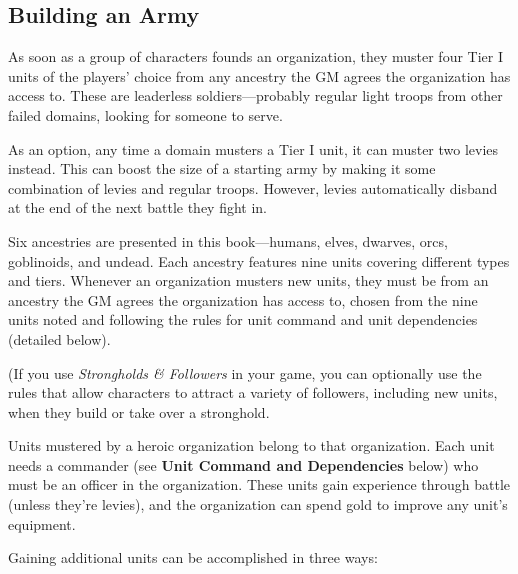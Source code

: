 \documentclass[10pt,a4paper,twoside,bg=print,twocolumn,openany,nodeprecatedcode]{dndbook}
\begin{document}
\subsection{Building an Army}
As soon as a group of characters founds an organization, they muster four Tier I units of the players' choice from any ancestry the GM agrees the organization has access to. These are leaderless soldiers—probably regular light troops from other failed domains, looking for someone to serve.

As an option, any time a domain musters a Tier I unit, it can muster two levies instead. This can boost the size of a starting army by making it some combination of levies and regular troops. However, levies automatically disband at the end of the next battle they fight in.

Six ancestries are presented in this book—humans, elves, dwarves, orcs, goblinoids, and undead. Each ancestry features nine units covering different types and tiers. Whenever an organization musters new units, they must be from an ancestry the GM agrees the organization has access to, chosen from the nine units noted and following the rules for unit command and unit dependencies (detailed below).

(If you use \textit{Strongholds \& Followers} in your game, you can optionally use the rules that allow characters to attract a variety of followers, including new units, when they build or take over a stronghold.

Units mustered by a heroic organization belong to that organization. Each unit needs a commander (see \textbf{Unit Command and Dependencies} below) who must be an officer in the organization. These units gain experience through battle (unless they're levies), and the organization can spend gold to improve any unit's equipment.

Gaining additional units can be accomplished in three ways:
\end{document}
